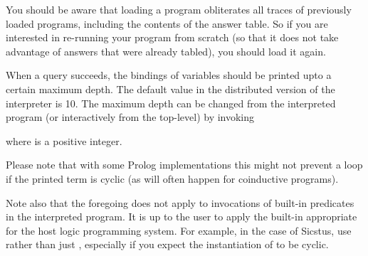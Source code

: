 You should be aware that loading a program obliterates all traces of
previously loaded programs, including the contents of the answer table.  So
if you are interested in re-running your program from scratch (so that it
does not take advantage of answers that were already tabled), you should load
it again.


When a query succeeds, the bindings of variables should be printed upto a
certain maximum depth.  The default value in the distributed version of the
interpreter is 10.  The maximum depth can be changed from the interpreted
program (or interactively from the top-level) by invoking\\
\ind{}\prog{~ )}

where  is a positive integer.

Please note that with some Prolog implementations this might not prevent a
loop if the printed term is cyclic (as will often happen for coinductive
programs).

Note also that the foregoing does not apply to invocations of built-in
predicates in the interpreted program.  It is up to the user to apply the
built-in appropriate for the host logic programming system.  For example, in
the case of Sicstus, use  rather
than just , especially if you expect the instantiation of
 to be cyclic.
